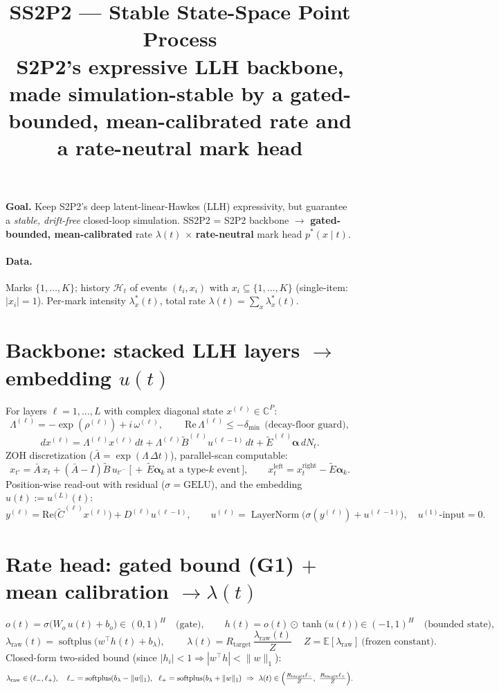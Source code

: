 \documentclass[11pt]{article}
\title{\textbf{SS2P2 — Stable State-Space Point Process}\\[2pt]
\large S2P2's expressive LLH backbone, made simulation-stable by a gated-bounded,
mean-calibrated rate and a rate-neutral mark head}
\author{}\date{}
\newcommand{\C}{\mathbb{C}}
\newcommand{\E}{\mathbb{E}}
\newcommand{\softplus}{\operatorname{softplus}}
\newcommand{\LN}{\operatorname{LayerNorm}}
\newcommand{\Lam}{\Lambda}
\begin{document}
\maketitle\vspace{-3em}

\noindent\textbf{Goal.} Keep S2P2's deep latent-linear-Hawkes (LLH) expressivity, but guarantee a
\emph{stable, drift-free} closed-loop simulation. SS2P2 = S2P2 backbone $\to$ \textbf{gated-bounded,
mean-calibrated} rate $\lambda(t)$ $\times$ \textbf{rate-neutral} mark head $p^*(x\mid t)$.

\paragraph{Data.} Marks $\{1,\dots,K\}$; history $\mathcal H_t$ of events $(t_i,x_i)$ with
$x_i\subseteq\{1,\dots,K\}$ (single-item: $|x_i|=1$). Per-mark intensity $\lambda^*_x(t)$, total rate
$\lambda(t)=\sum_x\lambda^*_x(t)$.

\section{Backbone: stacked LLH layers $\to$ embedding $u(t)$}
For layers $\ell=1,\dots,L$ with complex diagonal state $x^{(\ell)}\in\C^{P}$:
\[
\Lam^{(\ell)}=-\exp(\rho^{(\ell)})+i\,\omega^{(\ell)},\qquad
\boxed{\ \mathrm{Re}\,\Lam^{(\ell)}\le-\delta_{\min}\ }\ \text{(decay-floor guard)},
\]
\[
d x^{(\ell)}=\Lam^{(\ell)} x^{(\ell)}\,dt+\Lam^{(\ell)}\tilde B^{(\ell)} u^{(\ell-1)}\,dt
+\tilde E^{(\ell)}\boldsymbol\alpha\,dN_t .
\]
ZOH discretization ($\bar A=\exp(\Lam\,\Delta t)$), parallel-scan computable:
\[
x_{t'}=\bar A\,x_t+(\bar A-I)\tilde B\,u_{t'^-}\ \bigl[\,+\,\tilde E\boldsymbol\alpha_k\ \text{at a type-}k\text{ event}\,\bigr],
\qquad x^{\text{left}}_{t}=x^{\text{right}}_{t}-\tilde E\boldsymbol\alpha_k .
\]
Position-wise read-out with residual ($\sigma=\mathrm{GELU}$), and the embedding $u(t):=u^{(L)}(t)$:
\[
y^{(\ell)}=\mathrm{Re}\!\bigl(\tilde C^{(\ell)} x^{(\ell)}\bigr)+D^{(\ell)} u^{(\ell-1)},\qquad
u^{(\ell)}=\LN\!\bigl(\sigma(y^{(\ell)})+u^{(\ell-1)}\bigr),\quad u^{(1)}\text{-input}=0 .
\]

\section{Rate head: gated bound (G1) $+$ mean calibration $\to\lambda(t)$}
\[
o(t)=\sigma\!\bigl(W_o\,u(t)+b_o\bigr)\in(0,1)^{H}\quad\text{(gate)},\qquad
h(t)=o(t)\odot\tanh\!\bigl(u(t)\bigr)\in(-1,1)^{H}\quad\text{(bounded state)},
\]
\[
\lambda_{\mathrm{raw}}(t)=\softplus\!\bigl(w^{\top} h(t)+b_\lambda\bigr),\qquad
\boxed{\ \lambda(t)=R_{\mathrm{target}}\,\frac{\lambda_{\mathrm{raw}}(t)}{Z}\ }\quad
Z=\E[\lambda_{\mathrm{raw}}]\ \text{(frozen constant)} .
\]
Closed-form two-sided bound (since $|h_i|<1\Rightarrow|w^\top h|<\|w\|_1$):
\[
\lambda_{\mathrm{raw}}\in(\ell_-,\ell_+),\quad
\ell_-=\softplus(b_\lambda-\|w\|_1),\ \ \ell_+=\softplus(b_\lambda+\|w\|_1)
\ \Rightarrow\
\lambda(t)\in\Bigl(\tfrac{R_{\mathrm{target}}\ell_-}{Z},\ \tfrac{R_{\mathrm{target}}\ell_+}{Z}\Bigr).
\]
\end{document}

